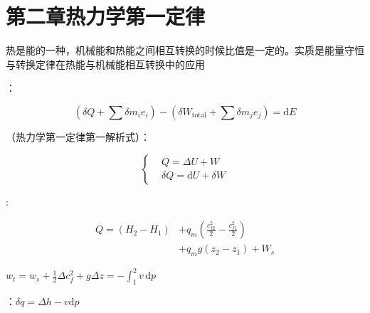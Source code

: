 \section{第二章\quad 热力学第一定律}

热是能的一种，机械能和热能之间相互转换的时候比值是一定的。实质是能量守恒与转换定律在热能与机械能相互转换中的应用

：

$$
    \left(\delta Q + \sum \delta m_i e_i\right) - \left(\delta W_\text{total}+\sum \delta m_je_j\right) = \mathrm{d}E
$$

（热力学第一定律第一解析式）：

$$
    \left\{
    \begin{aligned}
         & Q=\Delta U+W                      \\
         & \delta Q = \mathrm{d}U + \delta W
    \end{aligned}
    \right.
$$

:

$$
    \begin{aligned}
        Q=(H_2-H_1) & +q_m\left(\frac{c_{f2}^2}{2}-\frac{c_{f1}^2}{2}\right) \\
                    & +q_mg(z_2-z_1)+W_s
    \end{aligned}
$$

 $w_t=w_s+\frac{1}{2}\Delta c_f^2+g\Delta z=- \int_{1}^{2} v \, \mathrm{d}p$

：$\delta q =\Delta h-v\mathrm{d}p$

\divider